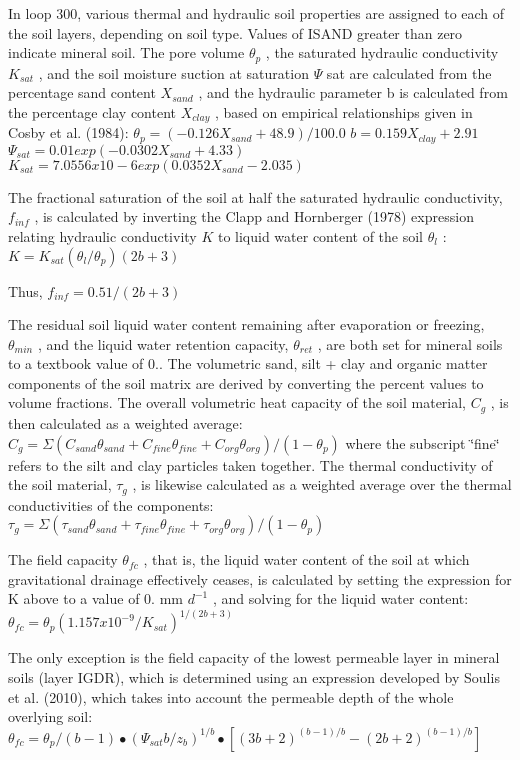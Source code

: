 In loop 300, various thermal and hydraulic soil properties are assigned to each of the soil layers, depending on soil type. Values of I\+S\+A\+N\+D greater than zero indicate mineral soil. The pore volume $\theta_p$ , the saturated hydraulic conductivity $K_{sat}$ , and the soil moisture suction at saturation $\Psi$ sat are calculated from the percentage sand content $X_{sand}$ , and the hydraulic parameter b is calculated from the percentage clay content $X_{clay}$ , based on empirical relationships given in Cosby et al. (1984)\+: $\theta_p = (-0.126 X_{sand} +48.9)/100.0$ $b = 0.159 X_{clay} + 2.91$ $\Psi_{sat} = 0.01 exp(-0.0302 X_{sand} + 4.33)$ $K_{sat} = 7.0556 x 10 -6 exp(0.0352 X_{sand} - 2.035)$

The fractional saturation of the soil at half the saturated hydraulic conductivity, $f_{inf}$ , is calculated by inverting the Clapp and Hornberger (1978) expression relating hydraulic conductivity $K$ to liquid water content of the soil $\theta_l$ \+: $K = K_{sat} (\theta_l / \theta_p ) (2b + 3)$

Thus, $f_{inf} = 0.5 1/(2b+3)$

The residual soil liquid water content remaining after evaporation or freezing, $\theta_{min}$ , and the liquid water retention capacity, $\theta_{ret}$ , are both set for mineral soils to a textbook value of 0.. The volumetric sand, silt + clay and organic matter components of the soil matrix are derived by converting the percent values to volume fractions. The overall volumetric heat capacity of the soil material, $C_g$ , is then calculated as a weighted average\+: $C_g = \Sigma (C_{sand} \theta_{sand} + C_{fine} \theta_{fine} + C_{org} \theta_{org} )/(1 - \theta_p )$ where the subscript \char`\"{}fine\char`\"{} refers to the silt and clay particles taken together. The thermal conductivity of the soil material, $\tau_g$ , is likewise calculated as a weighted average over the thermal conductivities of the components\+: $\tau_g = \Sigma (\tau_{sand} \theta_{sand} + \tau_{fine} \theta_{fine} + \tau_{org} \theta_{org} )/(1 - \theta_p )$

The field capacity $\theta_{fc}$ , that is, the liquid water content of the soil at which gravitational drainage effectively ceases, is calculated by setting the expression for K above to a value of 0. mm $d^{-1}$ , and solving for the liquid water content\+: $\theta_{fc} = \theta_p (1.157 x 10^{-9} /K_{sat} )^{1/(2b + 3)}$

The only exception is the field capacity of the lowest permeable layer in mineral soils (layer I\+G\+D\+R), which is determined using an expression developed by Soulis et al. (2010), which takes into account the permeable depth of the whole overlying soil\+: $\theta_{fc} = \theta_p /(b-1) \bullet (\Psi_{sat} b/ z_b )^{1/b} \bullet [(3b+2)^{(b-1)/b} - (2b+2)^{(b-1)/b} ]$

